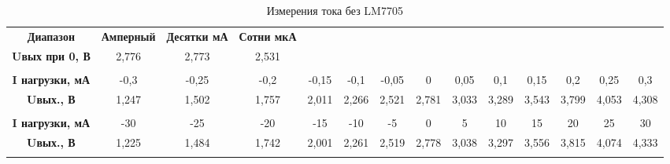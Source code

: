 \begin{table}[H]
    \centering
    \caption{Измерения тока без LM7705}
    \begin{turn}{90}
      \begin{tabular}{|c|c|c|c|c|c|c|c|c|c|c|c|c|c|}
  \cline{1-4}    \textbf{Диапазон} & \textbf{Амперный} & \textbf{Десятки мА} & \textbf{Сотни мкА} & \multicolumn{1}{c}{} & \multicolumn{1}{c}{} & \multicolumn{1}{c}{} & \multicolumn{1}{c}{} & \multicolumn{1}{c}{} & \multicolumn{1}{c}{} & \multicolumn{1}{c}{} & \multicolumn{1}{c}{} & \multicolumn{1}{c}{} & \multicolumn{1}{c}{} \bigstrut\\
  \cline{1-4}    \textbf{Uвых при 0, В} & 2,776 & 2,773 & 2,531 & \multicolumn{1}{c}{} & \multicolumn{1}{c}{} & \multicolumn{1}{c}{} & \multicolumn{1}{c}{} & \multicolumn{1}{c}{} & \multicolumn{1}{c}{} & \multicolumn{1}{c}{} & \multicolumn{1}{c}{} & \multicolumn{1}{c}{} & \multicolumn{1}{c}{} \bigstrut\\
  \cline{1-4}    \multicolumn{1}{c}{} & \multicolumn{1}{c}{} & \multicolumn{1}{c}{} & \multicolumn{1}{c}{} & \multicolumn{1}{c}{} & \multicolumn{1}{c}{} & \multicolumn{1}{c}{} & \multicolumn{1}{c}{} & \multicolumn{1}{c}{} & \multicolumn{1}{c}{} & \multicolumn{1}{c}{} & \multicolumn{1}{c}{} & \multicolumn{1}{c}{} & \multicolumn{1}{c}{} \bigstrut\\
      \hline
      \textbf{I нагрузки, мА} & -0,3  & -0,25 & -0,2  & -0,15 & -0,1  & -0,05 & 0     & 0,05  & 0,1   & 0,15  & 0,2   & 0,25  & 0,3 \bigstrut\\
      \hline
      \textbf{Uвых., В} & 1,247 & 1,502 & 1,757 & 2,011 & 2,266 & 2,521 & 2,781 & 3,033 & 3,289 & 3,543 & 3,799 & 4,053 & 4,308 \bigstrut\\
      \hline
      \multicolumn{1}{c}{} & \multicolumn{1}{c}{} & \multicolumn{1}{c}{} & \multicolumn{1}{c}{} & \multicolumn{1}{c}{} & \multicolumn{1}{c}{} & \multicolumn{1}{c}{} & \multicolumn{1}{c}{} & \multicolumn{1}{c}{} & \multicolumn{1}{c}{} & \multicolumn{1}{c}{} & \multicolumn{1}{c}{} & \multicolumn{1}{c}{} & \multicolumn{1}{c}{} \bigstrut\\
      \hline
      \textbf{I нагрузки, мА} & -30   & -25   & -20   & -15   & -10   & -5    & 0     & 5     & 10    & 15    & 20    & 25    & 30 \bigstrut\\
      \hline
      \textbf{Uвых., В} & 1,225 & 1,484 & 1,742 & 2,001 & 2,261 & 2,519 & 2,778 & 3,038 & 3,297 & 3,556 & 3,815 & 4,074 & 4,333 \bigstrut\\
      \hline
      \multicolumn{1}{c}{} & \multicolumn{1}{c}{} & \multicolumn{1}{c}{} & \multicolumn{1}{c}{} & \multicolumn{1}{c}{} & \multicolumn{1}{c}{} & \multicolumn{1}{c}{} & \multicolumn{1}{c}{} & \multicolumn{1}{c}{} & \multicolumn{1}{c}{} & \multicolumn{1}{c}{} & \multicolumn{1}{c}{} & \multicolumn{1}{c}{} & \multicolumn{1}{c}{} \bigstrut\\

\end{tabular}
\end{turn}
\end{table}
